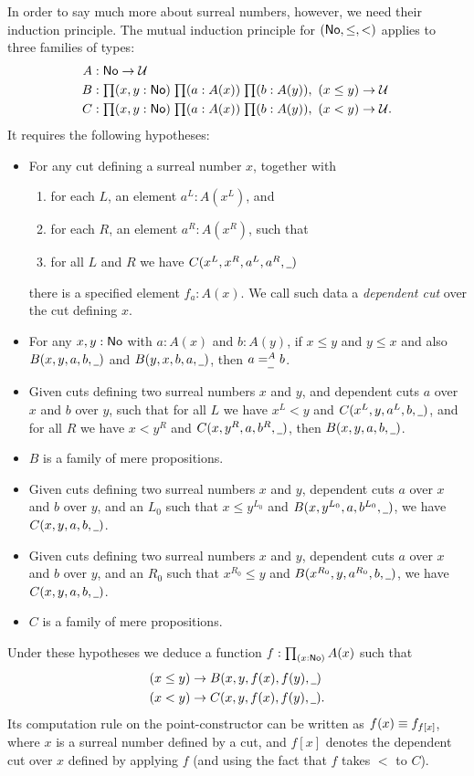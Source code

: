 In order to say much more about surreal numbers, however, we need their induction principle.
The mutual induction principle for $(\NO,\le,<)$ applies to three families of types:
\begin{align*}
  A &: \NO\to\type\\
  B &: \prd{x,y:\NO}{a:A(x)}{b:A(y)} (x\le y) \to \type\\
  C &: \prd{x,y:\NO}{a:A(x)}{b:A(y)} (x<y) \to \type.
\end{align*}
It requires the following hypotheses:
\begin{itemize}
\item For any cut defining a surreal number $x$, together with
  \begin{enumerate}
  \item for each $L$, an element $a^L:A(x^L)$, and
  \item for each $R$, an element $a^R:A(x^R)$, such that
  \item for all $L$ and $R$ we have $C(x^L,x^R,a^L,a^R,\blank)$
  \end{enumerate}
  there is a specified element $f_a:A(x)$.
  We call such data a \emph{dependent cut} over the cut defining $x$.
\item For any $x,y:\NO$ with $a:A(x)$ and $b:A(y)$, if $x\le y$ and $y\le x$ and also $B(x,y,a,b,\blank)$ and $B(y,x,b,a,\blank)$, then $\dpath{A}{\blank}{a}{b}$.
\item Given cuts defining two surreal numbers $x$ and $y$, and dependent cuts $a$ over $x$ and $b$ over $y$, such that for all $L$ we have $x^L<y$ and $C(x^L,y,a^L,b,\blank)$, and for all $R$ we have $x<y^R$ and $C(x,y^R,a,b^R,\blank)$, then $B(x,y,a,b,\blank)$.
\item $B$ is a family of mere propositions.
\item Given cuts defining two surreal numbers $x$ and $y$, dependent cuts $a$ over $x$ and $b$ over $y$, and an $L_0$ such that $x\le y^{L_0}$ and $B(x,y^{L_0},a,b^{L_0},\blank)$, we have $C(x,y,a,b,\blank)$.
\item Given cuts defining two surreal numbers $x$ and $y$, dependent cuts $a$ over $x$ and $b$ over $y$, and an ${R_0}$ such that $x^{R_0}\le y$ and $B(x^{R_0},y,a^{R_0},b,\blank)$, we have $C(x,y,a,b,\blank)$.
\item $C$ is a family of mere propositions.
\end{itemize}
Under these hypotheses we deduce a function $f:\prd{x:\NO} A(x)$ such that
\begin{align*}
  (x\le y) &\to B(x,y,f(x),f(y),\blank)\\
  (x< y) &\to C(x,y,f(x),f(y),\blank).
\end{align*}
Its computation rule on the point-constructor can be written as $f(x) \jdeq f_{f[x]}$, where $x$ is a surreal number defined by a cut, and $f[x]$ denotes the dependent cut over $x$ defined by applying $f$ (and using the fact that $f$ takes $<$ to $C$).

